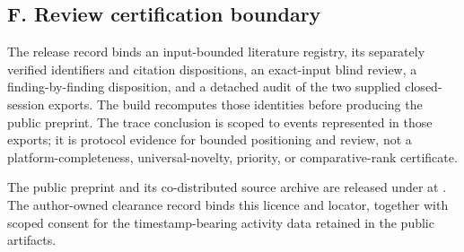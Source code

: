 \documentclass[11pt]{article}
\begin{document}
    \subsection*{F. Review certification boundary}

    The release record binds an input-bounded literature registry, its
    separately verified identifiers and citation dispositions, an exact-input
    blind review, a finding-by-finding disposition, and a detached audit of the
    two supplied closed-session exports. The build recomputes those identities before
    producing the public preprint. The trace conclusion is scoped to events
    represented in those exports; it is protocol evidence for bounded
    positioning and review, not a platform-completeness, universal-novelty,
    priority, or comparative-rank certificate.

    The public preprint and its co-distributed source archive are released
    under \PublicLicenseSPDX{} at \StableReleaseLocator. The author-owned
    clearance record binds this licence and locator, together with scoped
    consent for the timestamp-bearing activity data retained in the public
    artifacts.
  \else
    \PackageError{agent-graph-runtime}{Missing publication mode}{%
      Build with build.py in internal or release mode.%
    }%
  \fi
\fi



\end{document}
